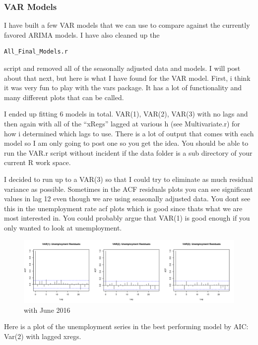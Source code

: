\documentclass[twoside,twocolumn]{article}
\begin{document}
     
      
      \subsubsection{VAR Models}

I have built a few VAR models that we can use to compare against the currently favored ARIMA models. I have also cleaned up the \begin{verbatim}All_Final_Models.r\end{verbatim} script and removed all of the seasonally adjusted data and models. I will post about that next, but here is what I have found for the VAR model. First, i think it was very fun to play with the vars package. It has a lot of functionality and many different plots that can be called.

I ended up fitting 6 models in total. VAR(1), VAR(2), VAR(3) with no lags and then again with all of the ``xRegs'' lagged at various h (see Multivariate.r) for how i determined which lags to use. There is a lot of output that comes with each model so I am only going to post one so you get the idea. You should be able to run the VAR.r script without incident if the data folder is a sub directory of your current R work space.

I decided to run up to a VAR(3) so that I could try to eliminate as much residual variance as possible. Sometimes in the ACF residuals plots you can see significant values in lag 12 even though we are using seasonally adjusted data. You dont see this in the unemployment rate acf plots which is good since thats what we are most interested in. You could probably argue that VAR(1) is good enough if you only wanted to look at unemployment. 

  \begin{figure}[H]
    	\centering
     	\caption{with June 2016}
     	\includegraphics[width=\linewidth]{images/varUnemresid}
 \end{figure}
 
 Here is a plot of the unemployment series in the best performing model by AIC: Var(2) with lagged xregs.
 
\end{document}
